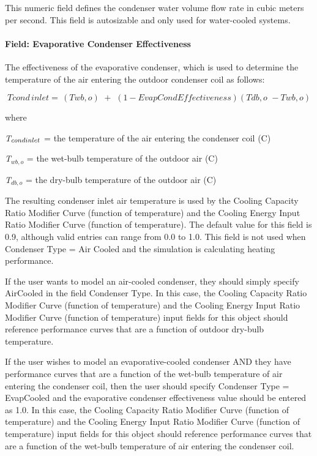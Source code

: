 This numeric field defines the condenser water volume flow rate in cubic meters per second. This field is autosizable and only used for water-cooled systems.

\paragraph{Field: Evaporative Condenser Effectiveness}\label{field-evaporative-condenser-effectiveness-002}

The effectiveness of the evaporative condenser, which is used to determine the temperature of the air entering the outdoor condenser coil as follows:

\begin{equation}
Tcond\,inlet = \,\left( {Twb,o} \right)\,\, + \,\,\left( {1 - EvapCondEffectiveness} \right)\left( {Tdb,o\,\, - Twb,o} \right)
\end{equation}

where

\emph{T\(_{cond\\ inlet}\)} = the temperature of the air entering the condenser coil (C)

\emph{T\(_{wb,o}\)} = the wet-bulb temperature of the outdoor air (C)

\emph{T\(_{db,o}\)} = the dry-bulb temperature of the outdoor air (C)

The resulting condenser inlet air temperature is used by the Cooling Capacity Ratio Modifier Curve (function of temperature) and the Cooling Energy Input Ratio Modifier Curve (function of temperature). The default value for this field is 0.9, although valid entries can range from 0.0 to 1.0. This field is not used when Condenser Type = Air Cooled and the simulation is calculating heating performance.

If the user wants to model an air-cooled condenser, they should simply specify AirCooled in the field Condenser Type. In this case, the Cooling Capacity Ratio Modifier Curve (function of temperature) and the Cooling Energy Input Ratio Modifier Curve (function of temperature) input fields for this object should reference performance curves that are a function of outdoor dry-bulb temperature.

If the user wishes to model an evaporative-cooled condenser AND they have performance curves that are a function of the wet-bulb temperature of air entering the condenser coil, then the user should specify Condenser Type = EvapCooled and the evaporative condenser effectiveness value should be entered as 1.0. In this case, the Cooling Capacity Ratio Modifier Curve (function of temperature) and the Cooling Energy Input Ratio Modifier Curve (function of temperature) input fields for this object should reference performance curves that are a function of the wet-bulb temperature of air entering the condenser coil.

